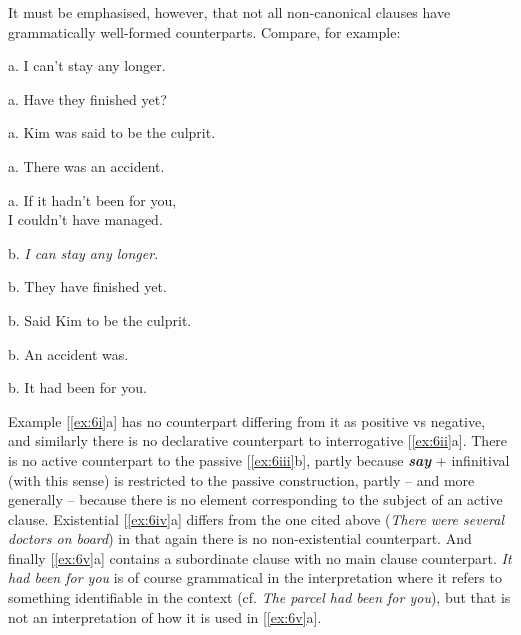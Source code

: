It must be emphasised, however, that not all non-canonical clauses have grammatically well-formed counterparts. Compare, for example:
\begin{examples}
\item \label{ex:6}
\noindent\begin{minipage}[t]{0.5\linewidth}
    \begin{examples}[nosep]\vspace{-6pt}
        \item \label{ex:6i}
            \textnormal{a.} I can't stay any longer.
        \item \label{ex:6ii}
            \textnormal{a.} Have they finished yet?
        \item \label{ex:6iii}
            \textnormal{a.} Kim was said to be the culprit.
        \item \label{ex:6iv}
            \textnormal{a.} There was an accident.
        \item \label{ex:6v}
            \textnormal{a.} If it hadn't been for you,\\ I couldn't have managed.
    \end{examples}
\end{minipage}\vspace{-\medskipamount}%
\begin{minipage}[t]{0.5\linewidth}
    b. \ungram \itshape I can stay any longer.
    
    \textnormal{b.} \ungram They have finished yet.
    
    \textnormal{b.} \ungram Said Kim to be the culprit.
    
    \textnormal{b.} \ungram An accident was.
    
    \textnormal{b.} \ungram It had been for you.
\end{minipage}\vspace{-\medskipamount}
\end{examples}
\medskip
Example [\ref{ex:6i}a] has no counterpart differing from it as positive vs negative, and similarly there is no declarative counterpart to interrogative [\ref{ex:6ii}a]. There is no active counterpart to the passive [\ref{ex:6iii}b], partly because \textit{\textbf{say}} + infinitival (with this sense) is restricted to the passive construction, partly -- and more generally -- because there is no element corresponding to the subject of an active clause. Existential [\ref{ex:6iv}a] differs from the one cited above (\textit{There were several doctors on board}) in that again there is no non-existential counterpart. And finally [\ref{ex:6v}a] contains a subordinate clause with no main clause counterpart. \textit{It had been for you} is of course grammatical in the interpretation where it refers to something identifiable in the context (cf. \textit{The parcel had been for you}), but that is not an interpretation of how it is used in [\ref{ex:6v}a].



